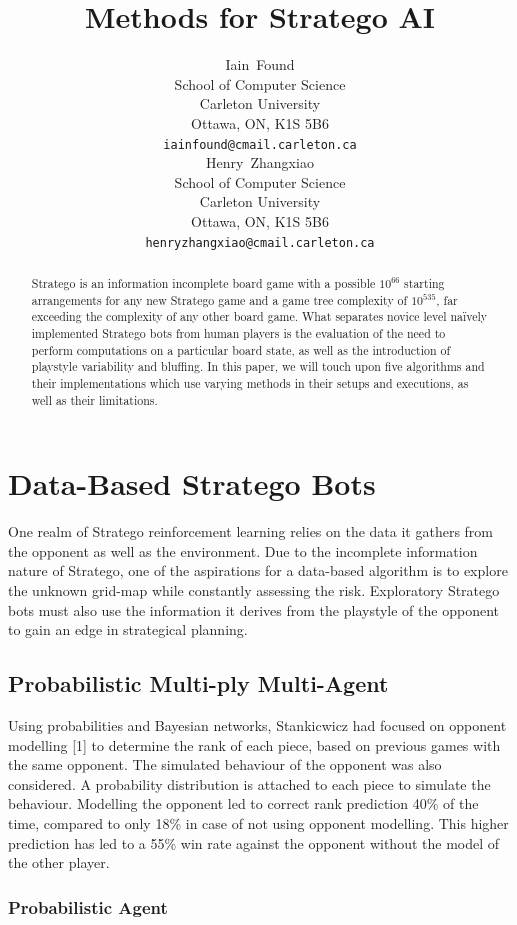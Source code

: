 \documentclass{article}
\title{Methods for Stratego AI}
\author{
  Iain~Found\\
  School of Computer Science\\
  Carleton University\\
  Ottawa, ON, K1S 5B6 \\
  \texttt{iainfound@cmail.carleton.ca} \\
  \And
  Henry~Zhangxiao\\
  School of Computer Science\\
  Carleton University\\
  Ottawa, ON, K1S 5B6 \\
  \texttt{henryzhangxiao@cmail.carleton.ca} \\
}
\begin{document}
\maketitle

\begin{abstract}
Stratego is an information incomplete board game with a possible $10^{66}$ starting arrangements for any new Stratego game and a game tree complexity of $10^{535}$, far exceeding the complexity of any other board game.
What separates novice level naïvely implemented Stratego bots from human players is the evaluation of the need to perform computations on a particular board state, as well as the introduction of playstyle variability and bluffing.
In this paper, we will touch upon five algorithms and their implementations which use varying methods in their setups and executions, as well as their limitations.
\end{abstract}

\section{Data-Based Stratego Bots}

One realm of Stratego reinforcement learning relies on the data it gathers from the opponent as well as the environment.
Due to the incomplete information nature of Stratego, one of the aspirations for a data-based algorithm is to explore the unknown grid-map while constantly assessing the risk.
Exploratory Stratego bots must also use the information it derives from the playstyle of the opponent to gain an edge in strategical planning.

\subsection{Probabilistic Multi-ply Multi-Agent}

Using probabilities and Bayesian networks, Stankicwicz had focused on opponent modelling [1] to determine the rank of each piece, based on previous games with the same opponent. 
The simulated behaviour of the opponent was also considered. A probability distribution is attached to each piece to simulate the behaviour. 
Modelling the opponent led to correct rank prediction 40\% of the time, compared to only 18\% in case of not using opponent modelling. 
This higher prediction has led to a 55\% win rate against the opponent without the model of the other player.

\subsubsection{Probabilistic Agent}
\end{document}
